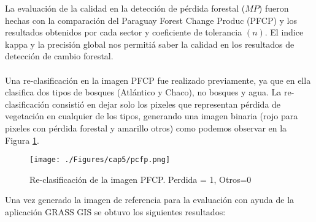 La evaluaci\'on de la calidad en la detecci\'on de p\'erdida forestal ($ MP $) fueron hechas con la comparaci\'on del Paraguay Forest Change Produc (PFCP) y los resultados obtenidos por cada sector y coeficiente de tolerancia $ (n) $. El indice kappa y la precisi\'on global nos permiti\'a saber la calidad en los resultados de detecci\'on de cambio forestal.\\~\\
Una re-clasificaci\'on en la imagen PFCP fue realizado previamente, ya que en ella clasifica dos tipos de bosques (Atl\'antico y Chaco), no bosques y agua. La re-clasificaci\'on consisti\'o en dejar solo los pixeles que representan p\'erdida de vegetaci\'on en cualquier de los tipos, generando una imagen binaria (rojo para pixeles con p\'erdida forestal y amarillo otros) como podemos observar en la Figura \ref{fig:pfcp}.
\begin{figure}[H]
	\centering
	\texttt{[image: ./Figures/cap5/pcfp.png]}
	\caption{Re-clasificaci\'on de la imagen PFCP. Perdida = 1, Otros=0}
	\label{fig:pfcp}
\end{figure}
Una vez generado la imagen de referencia para la evaluaci\'on con ayuda de la aplicaci\'on GRASS GIS se obtuvo los siguientes resultados:
